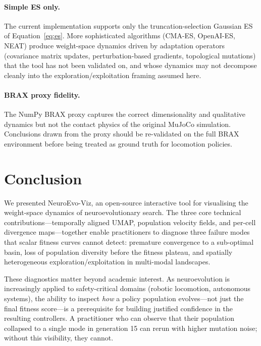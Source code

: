 \documentclass{article}
\begin{document}
\paragraph{Simple ES only.}
The current implementation supports only the truncation-selection Gaussian ES
of Equation~\eqref{eq:es}.
More sophisticated algorithms (CMA-ES, OpenAI-ES, NEAT) produce weight-space
dynamics driven by adaptation operators (covariance matrix updates,
perturbation-based gradients, topological mutations) that the tool has not been
validated on, and whose dynamics may not decompose cleanly into the
exploration/exploitation framing assumed here.

\paragraph{BRAX proxy fidelity.}
The NumPy BRAX proxy captures the correct dimensionality and qualitative
dynamics but not the contact physics of the original MuJoCo simulation.
Conclusions drawn from the proxy should be re-validated on the full BRAX
environment before being treated as ground truth for locomotion policies.


\section{Conclusion}
\label{sec:conclusion}

We presented NeuroEvo-Viz, an open-source interactive tool for visualising the
weight-space dynamics of neuroevolutionary search.
The three core technical contributions---temporally aligned UMAP, population
velocity fields, and per-cell divergence maps---together enable practitioners
to diagnose three failure modes that scalar fitness curves cannot detect:
premature convergence to a sub-optimal basin, loss of population diversity
before the fitness plateau, and spatially heterogeneous exploration/exploitation
in multi-modal landscapes.

These diagnostics matter beyond academic interest.
As neuroevolution is increasingly applied to safety-critical domains (robotic
locomotion, autonomous systems), the ability to inspect \emph{how} a policy
population evolves---not just the final fitness score---is a prerequisite for
building justified confidence in the resulting controllers.
A practitioner who can observe that their population collapsed to a single mode
in generation 15 can rerun with higher mutation noise; without this visibility,
they cannot.
\end{document}
